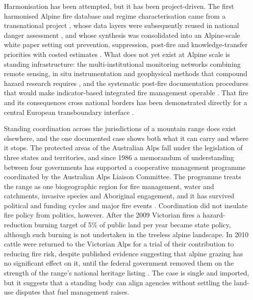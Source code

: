 \documentclass[11pt,a4paper]{article}
\begin{document}
Harmonisation has been attempted, but it has been project-driven. The first harmonised Alpine fire database and regime characterisation came from a transnational project \citep{valese_wildfires_2011}, whose data layers were subsequently reused in national danger assessment \citep{muller_towards_2020}, and whose synthesis was consolidated into an Alpine-scale white paper setting out prevention, suppression, post-fire and knowledge-transfer priorities with costed estimates \citep{muller_forest_2020}. What does not yet exist at Alpine scale is standing infrastructure: the multi-institutional monitoring networks combining remote sensing, in situ instrumentation and geophysical methods that compound hazard research requires \citep{baselt_compound_2026}, and the systematic post-fire documentation procedures that would make indicator-based integrated fire management operable \citep{melzner_wildfire-induced_2025}. That fire and its consequences cross national borders has been demonstrated directly for a central European transboundary interface \citep{avouris_exposure_2025}.

Standing coordination across the jurisdictions of a mountain range does exist elsewhere, and the one documented case shows both what it can carry and where it stops. The protected areas of the Australian Alps fall under the legislation of three states and territories, and since 1986 a memorandum of understanding between four governments has supported a cooperative management programme coordinated by the Australian Alps Liaison Committee. The programme treats the range as one biogeographic region for fire management, water and catchments, invasive species and Aboriginal engagement, and it has survived political and funding cycles and major fire events \citep{lockwood_biodiversity_2014}. Coordination did not insulate fire policy from politics, however. After the 2009 Victorian fires a hazard-reduction burning target of 5\% of public land per year became state policy, although such burning is not undertaken in the treeless alpine landscape. In 2010 cattle were returned to the Victorian Alps for a trial of their contribution to reducing fire risk, despite published evidence suggesting that alpine grazing has no significant effect on it, until the federal government removed them on the strength of the range's national heritage listing \citep{lockwood_biodiversity_2014}. The case is single and imported, but it suggests that a standing body can align agencies without settling the land-use disputes that fuel management raises.
\end{document}

